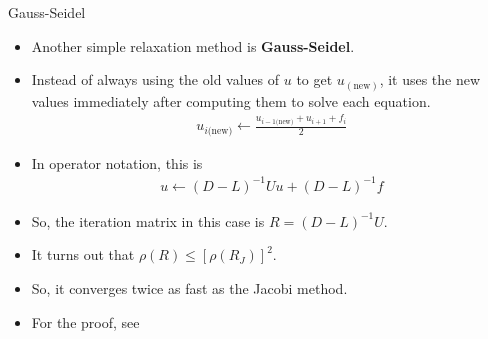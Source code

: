 \documentclass{beamer}
\begin{document}
\begin{frame}[label=gaussSeidel]{Gauss-Seidel}
 \begin{itemize}
  \item Another simple relaxation method is \textbf{Gauss-Seidel}.
  \item Instead of always using the old values of $u$ to get $u_{(\text{new})}$,
        it uses the new values immediately after computing them to solve each
        equation.
  \begin{align}
   u_{i\text{(new)}} \leftarrow \frac{u_{i-1\text{(new)}}+u_{i+1}+f_i}{2}
  \end{align}
  \item In operator notation, this is
  \begin{align}
   u \leftarrow (D-L)^{-1}Uu + (D-L)^{-1}f
  \end{align}
  \item So, the iteration matrix in this case is $R=(D-L)^{-1}U$.
  \item It turns out that $\rho(R) \leq \left[\rho(R_J)\right]^{2}$.
  \item So, it converges twice as fast as the Jacobi method.
  \item For the proof, see
        \hyperlink{gaussSeidelProof}{}
 \end{itemize}
\end{frame}
\end{document}
